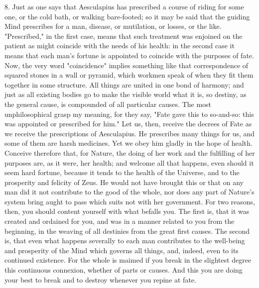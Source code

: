 \documentclass{book}
\begin{document}
8. Just as one says that Aesculapius has prescribed a course of riding
for some one, or the cold bath, or walking bare-footed; so it may be
said that the guiding Mind prescribes for a man, disease, or
mutilation, or losses, or the like. "Prescribed," in the first case,
means that such treatment was enjoined on the patient as might
coincide with the needs of his health: in the second case it means
that each man's fortune is appointed to coincide with the purposes of
fate. Now, the very word "coincidence" implies something like that
correspondence of squared stones in a wall or pyramid, which workmen
speak of when they fit them together in some structure. All things are
united in one bond of harmony; and just as all existing bodies go to
make the visible world what it is, so destiny, as the general cause,
is compounded of all particular causes. The most unphilosophical grasp
my meaning, for they say, "Fate gave this to so-and-so: this was
appointed or prescribed for him." Let us, then, receive the decrees of
Fate as we receive the prescriptions of Aesculapius. He prescribes
many things for us, and some of them are harsh medicines. Yet we obey
him gladly in the hope of health. Conceive therefore that, for Nature,
the doing of her work and the fulfilling of her purposes are, as it
were, her health; and welcome all that happens, even should it seem
hard fortune, because it tends to the health of the Universe, and to
the prosperity and felicity of Zeus. He would not have brought this or
that on any man did it not contribute to the good of the whole, nor
does any part of Nature's system bring aught to pass which suits not
with her government. For two reasons, then, you should content
yourself with what befalls you. The first is, that it was created and
ordained for you, and was in a manner related to you from the
beginning, in the weaving of all destinies from the great first
causes. The second is, that even what happens severally to each man
contributes to the well-being and prosperity of the Mind which governs
all things, and, indeed, even to its continued existence. For the
whole is maimed if you break in the slightest degree this continuous
connexion, whether of parts or causes. And this you are doing your
best to break and to destroy whenever you repine at fate.
\end{document}
